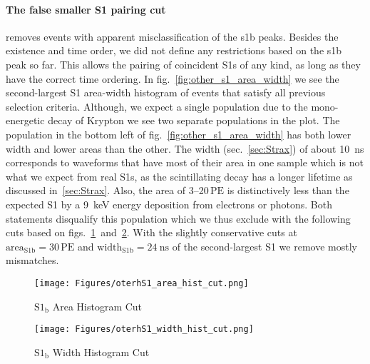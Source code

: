 \paragraph{The false smaller S1 pairing cut} removes events with apparent misclassification of the \gls{s1b} peaks.
Besides the existence and time order, we did not define any restrictions based on the \gls{s1b} peak so far.
This allows the pairing of coincident S1s of any kind, as long as they have the correct time ordering.
In fig.~\ref{fig:other_s1_area_width} we see the second-largest S1 area-width histogram of events that satisfy all previous selection criteria.
Although, we expect a single population due to the mono-energetic decay of Krypton we see two separate populations in the plot.
The population in the bottom left of fig.~\ref{fig:other_s1_area_width} has both lower width and lower areas than the other.
The width (sec.~\ref{sec:Strax}) of about \SI{10}{\nano\s} corresponds to waveforms that have most of their area in one sample which is not what we expect from real S1s, as the scintillating decay has a longer lifetime as discussed in~\ref{sec:Strax}.
Also, the area of \numrange{3}{20}$\,\mathrm{PE}$ is distinctively less than the expected S1 by a \SI{9}{\kilo\electronvolt} energy deposition from electrons or photons.
Both statements disqualify this population which we thus exclude with the following cuts based on figs.~\ref{fig:other_s1_area_cut}~and~\ref{fig:other_s1_width_cut}.
With the slightly conservative cuts at $ \mathrm{area}_\mathrm{S1b} = 30\,\mathrm{PE}$ and $ \mathrm{width}_\mathrm{S1b} = \SI{24}{\nano\s} $ of the second-largest S1 we remove mostly mismatches.


\begin{figure}[h]
\centering
\texttt{[image: Figures/oterhS1\_area\_hist\_cut.png]}  %
    \caption[$ \mathrm{S1}_\mathrm{b} $ Area Histogram Cut]{
        $ \mathrm{S1}_\mathrm{b} $ Area Histogram Cut
    }
\label{fig:other_s1_area_cut}
\end{figure}


\begin{figure}
\centering
\texttt{[image: Figures/oterhS1\_width\_hist\_cut.png]}  %
\caption[$ \mathrm{S1}_\mathrm{b} $ Width Histogram Cut]{
        $ \mathrm{S1}_\mathrm{b} $ Width Histogram Cut
    }
\label{fig:other_s1_width_cut}
\end{figure}


